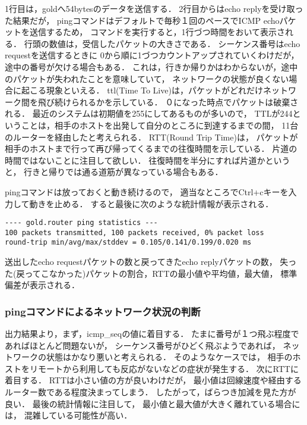 \documentclass[10pt,a4paper]{jarticle}
\begin{document}
1行目は，goldへ54bytesのデータを送信する．
2行目からはecho replyを受け取った結果だが，
pingコマンドはデフォルトで毎秒１回のペースでICMP echoパケットを送信するため，
コマンドを実行すると，1行づつ時間をおいて表示される．
行頭の数値は，受信したパケットの大きさである．
シーケンス番号はecho requestを送信するときに
0から順に1づつカウントアップされていくわけだが，途中の番号が欠ける場合もある．
これは，行きか帰りかはわからないが，途中のパケットが失われたことを意味していて，
ネットワークの状態が良くない場合に起こる現象といえる．
ttl(Time To Live)は，パケットがどれだけネットワーク間を飛び続けられるかを示している．
０になった時点でパケットは破棄される．
最近のシステムは初期値を255にしてあるものが多いので，
TTLが244ということは，相手のホストを出発して自分のところに到達するまでの間，
11台のルーターを経由したと考えられる．
RTT(Round Trip Time)は，
パケットが相手のホストまで行って再び帰ってくるまでの往復時間を示している．
片道の時間ではないことに注目して欲しい．
往復時間を半分にすれば片道かというと，
行きと帰りでは通る道筋が異なっている場合もある．

pingコマンドは放っておくと動き続けるので，
適当なところでCtrl+cキーを入力して動きを止める．
すると最後に次のような統計情報が表示される．
\begin{screen}
\begin{verbatim}
---- gold.router ping statistics ---
100 packets transmitted, 100 packets received, 0% packet loss
round-trip min/avg/max/stddev = 0.105/0.141/0.199/0.020 ms
\end{verbatim}
\end{screen}
送出したecho requestパケットの数と戻ってきたecho replyパケットの数，
失った(戻ってこなかった)パケットの割合，RTTの最小値や平均値，最大値，
標準偏差が表示される．

\vspace{-6mm}
\subsubsection{pingコマンドによるネットワーク状況の判断}
出力結果より，まず，icmp\_seqの値に着目する．
たまに番号が１つ飛ぶ程度であればほとんど問題ないが，
シーケンス番号がひどく飛ぶようであれば，
ネットワークの状態はかなり悪いと考えられる．
そのようなケースでは，
相手のホストをリモートから利用しても反応がないなどの症状が発生する．
次にRTTに着目する．
RTTは小さい値の方が良いわけだが，
最小値は回線速度や経由するルーター数である程度決まってしまう．
したがって，ばらつき加減を見た方が良い．
最後の統計情報に注目して，
最小値と最大値が大きく離れている場合には，
混雑している可能性が高い．
\end{document}
